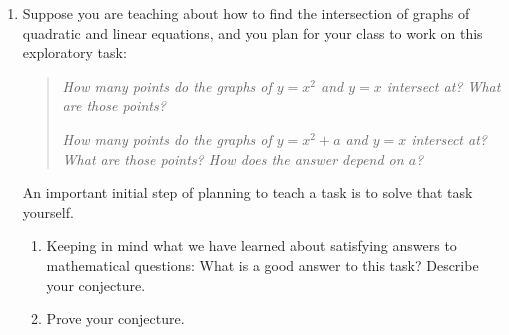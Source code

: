 \documentclass[11pt]{article}
\theoremstyle{definition}
\begin{document}
\begin{enumerate}[resume]
Suppose that you are teaching about intercepts of graphs and you are going over a solution to the problem: {\it Find the $y$-intercept of the graph of the equation $y=(x-3)^2$.} Your class has the following conversation:
	
		\begin{quote}
		You: How did you start this problem? \\ 
		Student A: I put in a 0 for the $x$-value. \\ 
		You: Let's talk about what Student A did. If we're finding a $y$-intercept, why do we start by putting a 0 for the $x$?  Anyone have an idea? \\
		Student B: Because zero's the easiest thing. \\ 
		Student C: Because zero is where the line crosses. \\
		Student B: Wait, it's because you want to cancel it out. 
		\end{quote}
	
	\begin{enumerate}
	\item Solve the problem that the class is working on.
	\item Explain the logic of student B's thinking.
	\item Explain the logic of student C's thinking.
	\item In the equivalent of at most 4 tweets, explain why `` If we're finding a $y$-intercept, we start by putting a 0 for the $x$.''. (A tweet is 140 characters.) Your explanation should tie together the definition of graph and the definition of $y$-intercept.
	\item What questions might you pose to students to get at the ideas in this explanation?
	\end{enumerate}

\item %
Suppose you are teaching about how to find the intersection of graphs of quadratic and linear equations, and you plan for your class to work on this exploratory task: 
	\begin{quote}
	{\it How many points do the graphs of $y=x^2$ and $y=x$ intersect at? What are those points?}
	
	{\it How many points do the graphs of $y=x^2+a$ and $y=x$ intersect at? What are those points? How does the answer depend on $a$?}
	\end{quote}

An important initial step of planning to teach a task is to solve that task yourself. 
	\begin{enumerate}
	\item Keeping in mind what we have learned about satisfying answers to mathematical questions: What is a good answer to this task? Describe your conjecture.
	\item Prove your conjecture. 
	\end{enumerate}
	

\end{enumerate}
\end{document}
